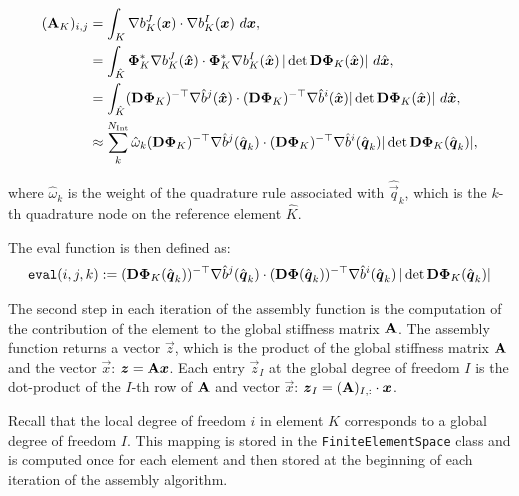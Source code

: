 \begin{align}
    (\mat{A}_K)_{i,j} & = \int_K \nabla b_K^J(\vec{x}) \cdot \nabla b_K^I(\vec{x}) \ d\vec{x},                                   \label{eq:ass_el_stiff_mat_1} \\
                      & = \int_{\hat{K}} \mat{\Phi}_{K}^* \nabla b_{K}^J(\vec{\hat{x}})
    \cdot \mat{\Phi}_{K}^* \nabla b_{K}^I(\hat{\vec{x}}) \, |\det \mat{D\Phi}_K(\hat{\vec{x}})| \ d\hat{\vec{x}},                \label{eq:ass_el_stiff_mat_2} \\
                      & = \int_{\hat{K}} (\mat{D\Phi}_{K})^{-\top} \nabla \hat{b}^j(\vec{\hat{x}})
    \cdot (\mat{D\Phi}_{K})^{-\top} \nabla \hat{b}^i(\hat{\vec{x}}) |\det \mat{D\Phi}_K(\hat{\vec{x}})| \ d\hat{\vec{x}},        \label{eq:ass_el_stiff_mat_3} \\
                      & \approx \sum_k^{N_\text{Int}} \hat{\omega}_k (\mat{D\Phi}_{K})^{-\top} \nabla \hat{b}^j(\hat{\vec{q}}_k)
    \cdot (\mat{D\Phi}_{K})^{-\top} \nabla \hat{b}^i(\hat{\vec{q}}_k) |\det \mat{D\Phi}_K(\hat{\vec{q}}_k)|,                     \label{eq:ass_el_stiff_mat_4}
\end{align}

where $\hat{\omega}_k$ is the weight of the quadrature rule associated with
$\hat{\vec{q}}_k$, which is the $k$-th quadrature node on the reference element $\hat{K}$.

The eval function is then defined as:
\begin{equation}
    \begin{aligned}
        \texttt{eval}(i, j, k) := (\mathbf{D \Phi}_K(\hat{\boldsymbol{q}}_k))^{-\top}
        \nabla \hat{b}^j(\hat{\boldsymbol{q}}_k)
        \cdot
        (\mathbf{D \Phi}(\hat{\boldsymbol{q}}_k))^{-\top}
        \nabla \hat{b}^i(\hat{\boldsymbol{q}}_k) \,
        |\det \mathbf{D \Phi}_K(\hat{\boldsymbol{q}}_k)|
    \end{aligned}
    \label{eq:eval}
\end{equation}

The second step in each iteration of the assembly function is the computation of the contribution of the element to the global stiffness matrix $\mathbf{A}$.
The assembly function returns a vector $\vec{z}$, which is the product of the global stiffness matrix $\mathbf{A}$ and the vector $\vec{x}$: $\boldsymbol{z} = \mathbf{A}\boldsymbol{x}$.
Each entry $\vec{z}_I$ at the global degree of freedom $I$ is the dot-product
of the $I$-th row of $\mathbf{A}$ and vector $\vec{x}$: $\boldsymbol{z}_I = (\mathbf{A})_{I,:} \cdot \boldsymbol{x}$.

Recall that the local degree of freedom $i$ in element $K$ corresponds to a global degree of freedom $I$.
This mapping is stored in the \texttt{FiniteElementSpace} class and is computed once for each element
and then stored at the beginning of each iteration of the assembly algorithm.

